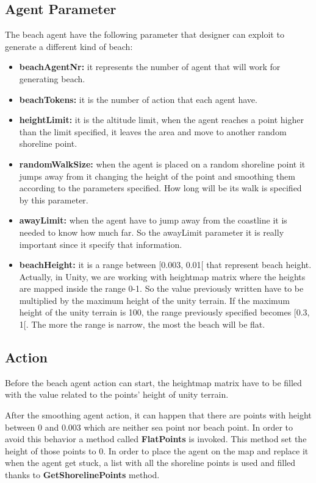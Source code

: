 \documentclass[12pt]{article}
\begin{document}
    \subsection{Agent Parameter}
    The beach agent have the following parameter that designer can exploit to generate a different kind of beach:

    \begin{itemize}
        \item \textbf{beachAgentNr:} it represents the number of agent that will work for generating beach.
        \item \textbf{beachTokens:} it is the number of action that each agent have.
        \item \textbf{heightLimit:} it is the altitude limit, when the agent reaches a point higher than the limit specified, it leaves the area
        and move to another random shoreline point.
        \item \textbf{randomWalkSize:} when the agent is placed on a random shoreline point it jumps away from it changing the height of
        the point and smoothing them according to the parameters specified. How long will be its walk is specified by this parameter.
        \item \textbf{awayLimit:} when the agent have to jump away from the coastline it is needed to know how much far.
        So the awayLimit parameter it is really important since it specify that information.
        \item \textbf{beachHeight:} it is a range between [0.003, 0.01[ that represent beach height. Actually, in Unity, we are working with heightmap
        matrix where the heights are mapped inside the range 0-1. So the value previously written have to be multiplied by the maximum height of the 
        unity terrain. If the maximum height of the unity terrain is 100, the range previously specified becomes [0.3, 1[. The more the range is narrow,
        the most the beach will be flat.
    \end{itemize}

    \subsection{Action}
    Before the beach agent action can start, the heightmap matrix have to be filled with the value related to the points' height of unity terrain.
    
    \noindent
    After the smoothing agent action, it can happen that there are points with height between 0 and 0.003 which are neither sea point nor beach point. In 
    order to avoid this behavior a method called \textbf{FlatPoints} is invoked. This method set the height of those points to 0.
    In order to place the agent on the map and replace it when the agent get stuck, a list with all the shoreline points is used and filled thanks to \textbf{GetShorelinePoints}
    method.
    
\end{document}
